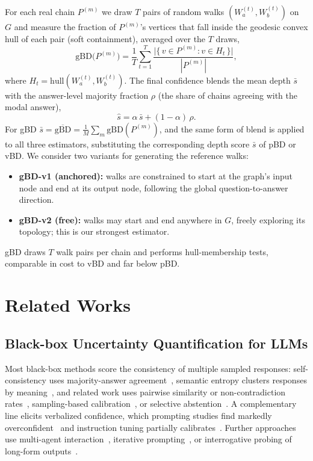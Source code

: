 \documentclass[twoside]{article}
\begin{document}
For each real chain $P^{(m)}$ we draw $T$ pairs of random walks
$(W_a^{(t)}, W_b^{(t)})$ on $G$ and measure the fraction of $P^{(m)}$'s vertices
that fall inside the geodesic convex hull of each pair (soft containment),
averaged over the $T$ draws,
\begin{equation}
  \text{gBD}\big(P^{(m)}\big) = \frac{1}{T} \sum_{t=1}^{T}
  \frac{\big|\{\, v \in P^{(m)} : v \in H_t \,\}\big|}{|P^{(m)}|},
\end{equation}
where $H_t = \text{hull}(W_a^{(t)}, W_b^{(t)})$.
The final confidence blends the mean depth $\bar{s}$ with the answer-level
majority fraction $\rho$ (the share of chains agreeing with the modal answer),
\begin{equation}
\label{eq:blend}
  \hat{s} = \alpha \, \bar{s} + (1 - \alpha)\, \rho.
\end{equation}
For gBD $\bar{s} = \overline{\text{gBD}} = \frac{1}{M}\sum_m \text{gBD}(P^{(m)})$,
and the same form of blend is applied to all three estimators, substituting the
corresponding depth score $\bar{s}$ of pBD or vBD. We consider two variants for generating
the reference walks:
\begin{itemize}
  \item \textbf{gBD-v1 (anchored):} walks are constrained to start at the graph's
        input node and end at its output node, following the global
        question-to-answer direction.
  \item \textbf{gBD-v2 (free):} walks may start and end anywhere in $G$, freely
        exploring its topology; this is our strongest estimator.
\end{itemize}

gBD draws $T$ walk pairs per chain and performs hull-membership tests, comparable
in cost to vBD and far below pBD.

\section{Related Works}
\label{sec:related}

\subsection{Black-box Uncertainty Quantification for LLMs}
Most black-box methods score the consistency of multiple sampled responses:
self-consistency uses majority-answer agreement~\citep{wang2023selfconsistency},
semantic entropy clusters responses by meaning~\citep{kuhn2023semantic, farquhar2024detecting},
and related work uses pairwise similarity or non-contradiction
rates~\citep{lin2023generating, manakul2023selfcheckgpt}, sampling-based
calibration~\citep{chen2024quantifying}, or selective
abstention~\citep{stelmakh2022selectively}. A complementary line elicits verbalized
confidence, which prompting studies find markedly overconfident~\citep{xiong2024llms}
and instruction tuning partially calibrates~\citep{liu2024uait}. Further approaches
use multi-agent interaction~\citep{feng2025multiagent}, iterative
prompting~\citep{abbasiyadkori2024believe}, or interrogative probing of long-form
outputs~\citep{fan2026iuq}.
\end{document}
